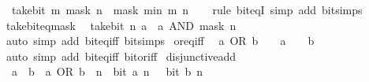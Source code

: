 \begin{isabellebody}
\ \ {\isacartoucheopen}take{\isacharunderscore}{\kern0pt}bit\ m\ {\isacharparenleft}{\kern0pt}mask\ n{\isacharparenright}{\kern0pt}\ {\isacharequal}{\kern0pt}\ mask\ {\isacharparenleft}{\kern0pt}min\ m\ n{\isacharparenright}{\kern0pt}{\isacartoucheclose}\isanewline
%
\isadelimproof
\ \ %
\endisadelimproof
%
\isatagproof
{}\isamarkupfalse%
\ {\isacharparenleft}{\kern0pt}rule\ bit{\isacharunderscore}{\kern0pt}eqI{\isacharparenright}{\kern0pt}\ {\isacharparenleft}{\kern0pt}simp\ add{\isacharcolon}{\kern0pt}\ bit{\isacharunderscore}{\kern0pt}simps{\isacharparenright}{\kern0pt}%
\endisatagproof
{\isafoldproof}%
%
\isadelimproof
\isanewline
%
\endisadelimproof
\isanewline
{}\isamarkupfalse%
\ take{\isacharunderscore}{\kern0pt}bit{\isacharunderscore}{\kern0pt}eq{\isacharunderscore}{\kern0pt}mask{\isacharcolon}{\kern0pt}\isanewline
\ \ {\isacartoucheopen}take{\isacharunderscore}{\kern0pt}bit\ n\ a\ {\isacharequal}{\kern0pt}\ a\ AND\ mask\ n{\isacartoucheclose}\isanewline
%
\isadelimproof
\ \ %
\endisadelimproof
%
\isatagproof
{}\isamarkupfalse%
\ {\isacharparenleft}{\kern0pt}auto\ simp\ add{\isacharcolon}{\kern0pt}\ bit{\isacharunderscore}{\kern0pt}eq{\isacharunderscore}{\kern0pt}iff\ bit{\isacharunderscore}{\kern0pt}simps{\isacharparenright}{\kern0pt}%
\endisatagproof
{\isafoldproof}%
%
\isadelimproof
\isanewline
%
\endisadelimproof
\isanewline
{}\isamarkupfalse%
\ or{\isacharunderscore}{\kern0pt}eq{\isacharunderscore}{\kern0pt}{}{\isacharunderscore}{\kern0pt}iff{\isacharcolon}{\kern0pt}\isanewline
\ \ {\isacartoucheopen}a\ OR\ b\ {\isacharequal}{\kern0pt}\ {}\ {\isasymlongleftrightarrow}\ a\ {\isacharequal}{\kern0pt}\ {}\ {\isasymand}\ b\ {\isacharequal}{\kern0pt}\ {}{\isacartoucheclose}\isanewline
%
\isadelimproof
\ \ %
\endisadelimproof
%
\isatagproof
{}\isamarkupfalse%
\ {\isacharparenleft}{\kern0pt}auto\ simp\ add{\isacharcolon}{\kern0pt}\ bit{\isacharunderscore}{\kern0pt}eq{\isacharunderscore}{\kern0pt}iff\ bit{\isacharunderscore}{\kern0pt}or{\isacharunderscore}{\kern0pt}iff{\isacharparenright}{\kern0pt}%
\endisatagproof
{\isafoldproof}%
%
\isadelimproof
\isanewline
%
\endisadelimproof
\isanewline
{}\isamarkupfalse%
\ disjunctive{\isacharunderscore}{\kern0pt}add{\isacharcolon}{\kern0pt}\isanewline
\ \ {\isacartoucheopen}a\ {\isacharplus}{\kern0pt}\ b\ {\isacharequal}{\kern0pt}\ a\ OR\ b{\isacartoucheclose}\ \ {\isacartoucheopen}{\isasymAnd}n{\isachardot}{\kern0pt}\ {\isasymnot}\ bit\ a\ n\ {\isasymor}\ {\isasymnot}\ bit\ b\ n{\isacartoucheclose}\isanewline

\end{isabellebody}
